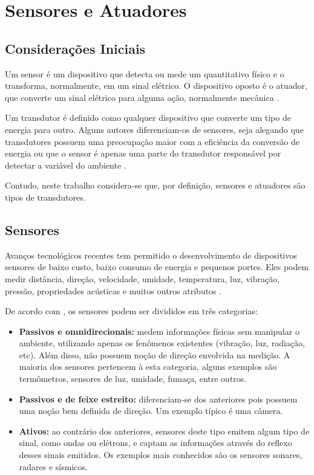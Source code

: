 \chapter{Sensores e Atuadores}
\label{cap:3}

\section{Considerações Iniciais}
Um sensor é um dispositivo que detecta ou mede um quantitativo físico e o transforma, normalmente, em um sinal
elétrico. O dispositivo oposto é o atuador, que converte um sinal elétrico para alguma ação, normalmente
mecânica \cite{sinclair2001}.

Um transdutor é definido como qualquer dispositivo que converte um tipo de energia para outro. Alguns
autores diferenciam-os de sensores, seja alegando que transdutores possuem uma preocupação maior com a eficiência
da conversão de energia ou que o sensor é apenas uma parte do transdutor responsável por detectar a variável
do ambiente \cite{sinclair2001,kondrasovas2013}.

Contudo, neste trabalho considera-se que, por definição, sensores e atuadores são tipos de transdutores.

\section{Sensores}
Avanços tecnológicos recentes tem permitido o desenvolvimento de dispositivos sensores de baixo custo, baixo
consumo de energia e pequenos portes. Eles podem medir distância, direção, velocidade, umidade, temperatura, luz,
vibração, pressão, propriedades acústicas e muitos outros atributos \cite{hai_nayak_stojmenovic2010}.

De acordo com , os sensores podem ser divididos em três categorias:
\begin{itemize}
	\item \textbf{Passivos e omnidirecionais:} medem informações físicas sem manipular o ambiente,
	utilizando apenas os fenômenos existentes (vibração, luz, radiação, etc). Além disso, não possuem
	noção de direção envolvida na medição. A maioria dos sensores pertencem à esta categoria, alguns
	exemplos são termômetros, sensores de luz, umidade, fumaça, entre outros.
	\item \textbf{Passivos e de feixe estreito:} diferenciam-se dos anteriores pois possuem uma noção bem
	definida de direção. Um exemplo típico é uma câmera.
	\item \textbf{Ativos:} ao contrário dos anteriores, sensores deste tipo emitem algum tipo de sinal,
	como ondas ou elétrons, e captam as informações através do reflexo desses sinais emitidos. Os
	exemplos mais conhecidos são os sensores sonares, radares e sísmicos.
\end{itemize}

